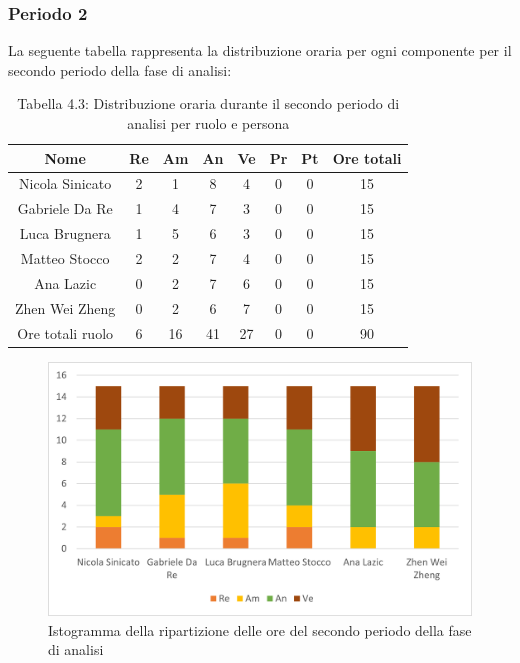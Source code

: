 \subsubsection{Periodo 2}
%
La seguente tabella rappresenta la distribuzione oraria per ogni componente per il secondo periodo della fase di analisi:
\begin{table}[h]
	\setlength\extrarowheight{5pt}
	\centering
	\begin{tabularx}{\textwidth}{|ccccccc|c|}
		\hline
		\rowcolor{white}
		\textbf{Nome} & \textbf{Re} & \textbf{Am} & \textbf{An} & \textbf{Ve} & \textbf{Pr}& \textbf{Pt} & \textbf{Ore totali} \\
		\hline
		Nicola Sinicato &2&1&8&4&0&0&15 \\
		Gabriele Da Re &1&4&7&3&0&0&15 \\
		Luca Brugnera &1&5&6&3&0&0&15 \\
		Matteo Stocco &2&2&7&4&0&0&15 \\
		Ana Lazic &0&2&7&6&0&0&15 \\
		Zhen Wei Zheng &0&2&6&7&0&0&15 \\
		\hline
		Ore totali ruolo &6&16&41&27&0&0&90 \\
		\hline
	\end{tabularx}
	\vspace{10pt}
	\caption{Tabella 4.3: Distribuzione oraria durante il secondo periodo di analisi per ruolo e persona}
\end{table}
\begin{figure}[H]
    \centering
    \includegraphics[scale=0.6]{img/grafi preventivo/istogrammi/analisi/periodo2.png}
    \caption{Istogramma della ripartizione delle ore del secondo periodo della fase di analisi}
\end{figure}

